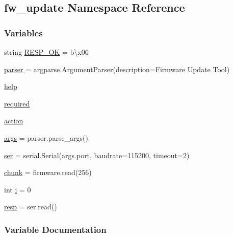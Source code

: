 \hypertarget{namespacefw__update}{}\subsection{fw\+\_\+update Namespace Reference}
\label{namespacefw__update}
\subsubsection*{Variables}
\begin{DoxyCompactItemize}
\item 
string \hyperlink{namespacefw__update_af4ca9d8fccedc8558fd80352ca87756d}{R\+E\+S\+P\+\_\+\+OK} = b\textquotesingle{}\textbackslash{}x06\textquotesingle{}
\item 
\hyperlink{namespacefw__update_a90eee7a4677ca8b1ed116364a24367f9}{parser} = argparse.\+Argument\+Parser(description=\textquotesingle{}Firmware Update Tool\textquotesingle{})
\item 
\hyperlink{namespacefw__update_a81ae9faedaa69e3e28e2960a0548df8d}{help}
\item 
\hyperlink{namespacefw__update_ae81948490ddf54e80a22593640178350}{required}
\item 
\hyperlink{namespacefw__update_a2f4ab7bf743142dae2e459aa18f9f1d4}{action}
\item 
\hyperlink{namespacefw__update_a8187411843a6284ffb964ef3fb9fcab3}{args} = parser.\+parse\+\_\+args()
\item 
\hyperlink{namespacefw__update_a5b7028344d79661ed4abe535b0e7e307}{ser} = serial.\+Serial(args.\+port, baudrate=115200, timeout=2)
\item 
\hyperlink{namespacefw__update_a4180e227b48ebb1901dbb822f1fc95f6}{chunk} = firmware.\+read(256)
\item 
int \hyperlink{namespacefw__update_acb559820d9ca11295b4500f179ef6392}{i} = 0
\item 
\hyperlink{namespacefw__update_a4a2eceb977b50eb0028c419047e56e1d}{resp} = ser.\+read()
\end{DoxyCompactItemize}


\subsubsection{Variable Documentation}
\mbox{\label{namespacefw__update_a2f4ab7bf743142dae2e459aa18f9f1d4}} 
